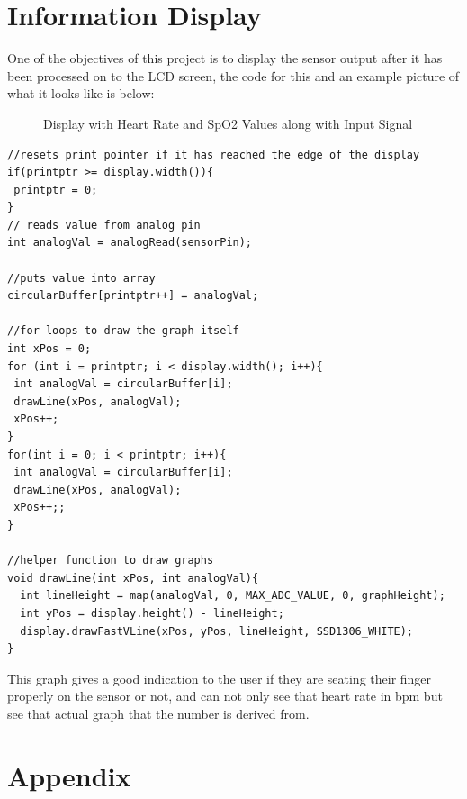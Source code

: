 \documentclass{article}
\begin{document}
\section{Information Display}
One of the objectives of this project is to display the sensor output after it has been processed on to the LCD screen, the code for this and an example picture of what it looks like is below:
\begin{figure}[h]
    \centering
    \caption{Display with Heart Rate and SpO2 Values along with Input Signal}
    \label{}
\end{figure}
\begin{lstlisting}[language=Arduino, caption= Display Code]
//resets print pointer if it has reached the edge of the display
if(printptr >= display.width()){
 printptr = 0;
}
// reads value from analog pin 
int analogVal = analogRead(sensorPin);

//puts value into array 
circularBuffer[printptr++] = analogVal;

//for loops to draw the graph itself
int xPos = 0; 
for (int i = printptr; i < display.width(); i++){
 int analogVal = circularBuffer[i];
 drawLine(xPos, analogVal);
 xPos++;
}
for(int i = 0; i < printptr; i++){
 int analogVal = circularBuffer[i];
 drawLine(xPos, analogVal);
 xPos++;;
} 

//helper function to draw graphs
void drawLine(int xPos, int analogVal){
  int lineHeight = map(analogVal, 0, MAX_ADC_VALUE, 0, graphHeight);
  int yPos = display.height() - lineHeight;
  display.drawFastVLine(xPos, yPos, lineHeight, SSD1306_WHITE);
}
\end{lstlisting}
This graph gives a good indication to the user if they are seating their finger properly on the sensor or not, and can not only see that heart rate in bpm but see that actual graph that the number is derived from.
\newpage


\section{Appendix}
\end{document}
